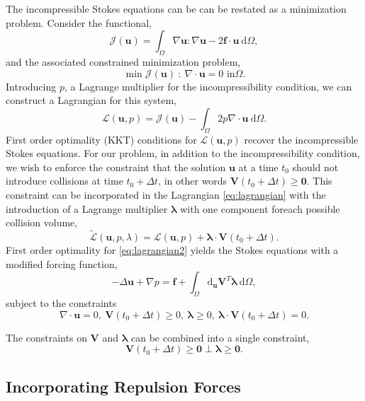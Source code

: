 \documentclass[preprint, 10pt]{elsarticle}
\begin{document}
The incompressible Stokes equations can be can be restated as a minimization
problem. Consider the functional,
\[ \mathcal{J}(\mathbf{u}) = \int_{\Omega} \nabla\mathbf{u}:\nabla\mathbf{u} -
2\mathbf{f}\cdot\mathbf{u} ~\text{d}\Omega,\]
and the associated constrained minimization problem,
\[ \min \mathcal{J}(\mathbf{u}) ~:~ \nabla\cdot\mathbf{u} = 0 \text{ in
}\Omega.\]
Introducing $p$, a Lagrange multiplier for the incompressibility condition, we
can construct a Lagrangian for this system,
\begin{equation}\label{eq:lagrangian} \mathcal{L}(\mathbf{u},p) =
\mathcal{J}(\mathbf{u}) - \int_{\Omega}
2p\nabla\cdot\mathbf{u}~\text{d}\Omega.\end{equation}
First order optimality (KKT) conditions for $\mathcal{L}(\mathbf{u},p)$ recover
the incompressible Stokes equations. For our problem, in addition to the
incompressibility condition, we wish to enforce the constraint that the solution $\mathbf{u}$ at a time $t_0$ should not introduce collisions at time $t_0+\Delta t$, in other words $\mathbf{V}(t_0 + \Delta t) \geq \mathbf{0}$.
This constraint can be incorporated in the Lagrangian \eqref{eq:lagrangian} with the introduction of a Lagrange multiplier $\pmb{\lambda}$ with one component foreach possible collision volume,
\begin{equation}\label{eq:lagrangian2} \tilde{\mathcal{L}}(\mathbf{u},p,\lambda)= \mathcal{L}(\mathbf{u},p) + \pmb{\lambda} \cdot \mathbf{V}(t_0+\Delta
t).\end{equation}
First order optimality for \eqref{eq:lagrangian2} yields the Stokes equations
with a modified forcing function,
\begin{equation}\label{eq:stokes_mod}-\Delta \mathbf{u} + \nabla p = \mathbf{f}
+ \int_{\Omega} \text{d}_{\mathbf{u}} \mathbf{V}^T\pmb{\lambda}
~\text{d}\Omega,\end{equation}
subject to the constraints
\[ \nabla\cdot\mathbf{u} =0, ~\mathbf{V}(t_0 + \Delta t) \geq 0,~\pmb{\lambda}
\geq 0, ~ \pmb{\lambda}\cdot\mathbf{V}(t_0+\Delta t) = 0. \]

The constraints on $\mathbf{V}$ and $\pmb{\lambda}$ can be combined into a
single constraint,
\begin{equation}\label{eq:ncp_constraint} \mathbf{V}(t_0 + \Delta t)\geq
\mathbf{0} \perp \pmb{\lambda}\geq \mathbf{0}.\end{equation}


\subsection{Incorporating Repulsion Forces}
\end{document}
